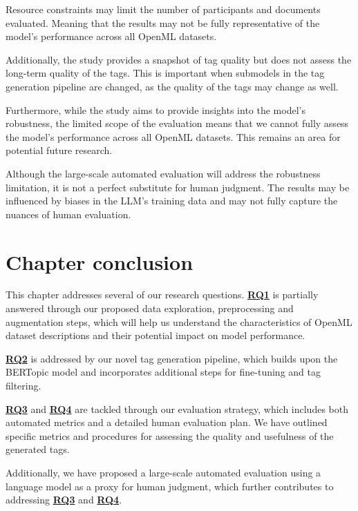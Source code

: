 Resource constraints may limit the number of participants and documents evaluated. Meaning that the results may not be fully representative of the model's performance across all OpenML datasets.

Additionally, the study provides a snapshot of tag quality but does not assess the long-term quality of the tags. This is important when submodels in the tag generation pipeline are changed, as the quality of the tags may change as well.

Furthermore, while the study aims to provide insights into the model's robustness, the limited scope of the evaluation means that we cannot fully assess the model's performance across all OpenML datasets. This remains an area for potential future research.

Although the large-scale automated evaluation will address the robustness limitation, it is not a perfect substitute for human judgment. The results may be influenced by biases in the LLM's training data and may not fully capture the nuances of human evaluation.

\section{Chapter conclusion}
This chapter addresses several of our research questions. \hyperref[rq1]{\textbf{RQ1}} is partially answered through our proposed data exploration, preprocessing and augmentation steps, which will help us understand the characteristics of OpenML dataset descriptions and their potential impact on model performance.

\hyperref[rq2]{\textbf{RQ2}} is addressed by our novel tag generation pipeline, which builds upon the BERTopic model and incorporates additional steps for fine-tuning and tag filtering.

\hyperref[rq3]{\textbf{RQ3}} and \hyperref[rq4]{\textbf{RQ4}} are tackled through our evaluation strategy, which includes both automated metrics and a detailed human evaluation plan. We have outlined specific metrics and procedures for assessing the quality and usefulness of the generated tags.

Additionally, we have proposed a large-scale automated evaluation using a language model as a proxy for human judgment, which further contributes to addressing \hyperref[rq3]{\textbf{RQ3}} and \hyperref[rq4]{\textbf{RQ4}}.